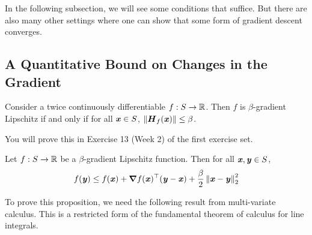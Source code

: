 In the following subsection, we will see some conditions that
suffice.
But there are also many other settings where one can show that some
form of gradient descent converges.

\subsection{A Quantitative Bound on Changes in the Gradient}

\begin{proposition}
\label{prp:hessiangradlip}
  Consider a twice continuously differentiable $f: S \to \mathbb{R}$.
  Then $f$ is $\beta$-gradient Lipschitz if and only if for all $\boldsymbol{\mathit{x}} \in
 S$,
  $\left\| \boldsymbol{{H}}_f(\boldsymbol{\mathit{x}}) \right\| \leq \beta$.
\end{proposition}
 You will prove this in Exercise 13 (Week 2) of the first exercise set.

\begin{proposition}
  \label{prp:lipgradub}
  Let $f: S \to \mathbb{R}$ be a $\beta$-gradient Lipschitz function.
  Then for all $\boldsymbol{\mathit{x}}, \boldsymbol{\mathit{y}} \in S$,
  \[
    f(\boldsymbol{\mathit{y}}) \leq f(\boldsymbol{\mathit{x}}) + \boldsymbol{\nabla} f(\boldsymbol{\mathit{x}})^\top (\boldsymbol{\mathit{y}}-\boldsymbol{\mathit{x}}) + \frac{\beta}{2}
    \left\| \boldsymbol{\mathit{x}}-\boldsymbol{\mathit{y}} \right\|_2^2
    \]
\end{proposition}

To prove this proposition, we need the following result from
multi-variate calculus. This is a restricted form of the fundamental
theorem of calculus for line integrals.

